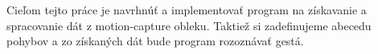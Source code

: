 Cieľom tejto práce je navrhnúť a implementovať program na získavanie a spracovanie dát z motion-capture obleku. Taktiež si zadefinujeme abecedu pohybov a zo získaných dát bude program rozoznávať gestá.